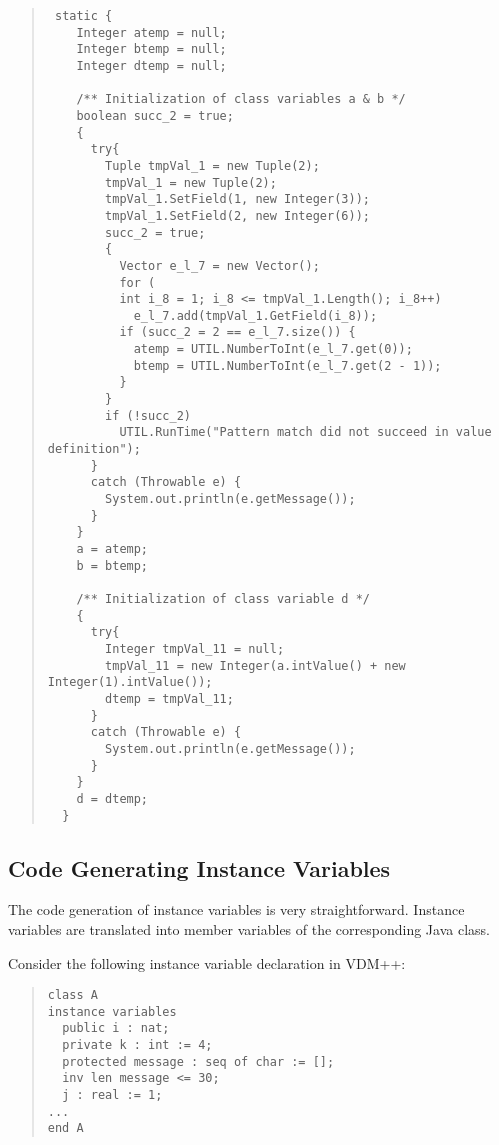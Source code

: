 \documentclass[\pformat,11pt]{article}
\newcommand{\VDM}{VDM++}
\begin{document}
\begin{quote}
\begin{small}
\begin{verbatim}
 static {
    Integer atemp = null;
    Integer btemp = null;
    Integer dtemp = null;    

    /** Initialization of class variables a & b */
    boolean succ_2 = true;
    {
      try{        
        Tuple tmpVal_1 = new Tuple(2);
        tmpVal_1 = new Tuple(2);
        tmpVal_1.SetField(1, new Integer(3));
        tmpVal_1.SetField(2, new Integer(6));
        succ_2 = true;
        {          
          Vector e_l_7 = new Vector();
          for (
          int i_8 = 1; i_8 <= tmpVal_1.Length(); i_8++) 
            e_l_7.add(tmpVal_1.GetField(i_8));
          if (succ_2 = 2 == e_l_7.size()) {
            atemp = UTIL.NumberToInt(e_l_7.get(0));
            btemp = UTIL.NumberToInt(e_l_7.get(2 - 1));
          }
        }
        if (!succ_2)
          UTIL.RunTime("Pattern match did not succeed in value definition");
      }
      catch (Throwable e) {
        System.out.println(e.getMessage());
      }
    }
    a = atemp;
    b = btemp;

    /** Initialization of class variable d */
    {
      try{        
        Integer tmpVal_11 = null;
        tmpVal_11 = new Integer(a.intValue() + new Integer(1).intValue());
        dtemp = tmpVal_11;
      }
      catch (Throwable e) {
        System.out.println(e.getMessage());
      }
    }
    d = dtemp;
  }
\end{verbatim}
\end{small}
\end{quote}


\subsection{Code Generating Instance Variables}
\label{sec:instvars}

The code generation of instance variables is very straightforward.
Instance variables are translated into member variables of the
corresponding Java class. 

Consider the following instance variable declaration in \VDM{}: 

\begin{quote}
\begin{verbatim}
class A
instance variables
  public i : nat;
  private k : int := 4;
  protected message : seq of char := [];
  inv len message <= 30;
  j : real := 1;
...
end A
\end{verbatim}
\end{quote}
\end{document}
